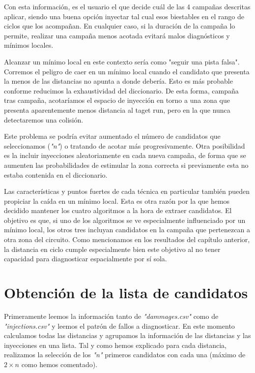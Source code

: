 Con esta información, es el usuario el que decide cuál de las 4 campañas descritas
aplicar, siendo una buena opción inyectar tal cual esos biestables en el rango de
ciclos que los acompañan. En cualquier caso, si la duración de la campaña lo
permite, realizar una campaña menos acotada evitará malos diagnósticos y mínimos
locales.

Alcanzar un mínimo local en este contexto sería como "seguir una pista falsa".
Corremos el peligro de caer en un mínimo local cuando el candidato que presenta la
menos de las distancias no apunta a donde debería. Esto es más probable conforme
reducimos la exhaustividad del diccionario. De esta forma, campaña tras campaña,
acotaríamos el espacio de inyección en torno a una zona que presenta aparentemente
menos distancia al taget run, pero en la que nunca detectaremos una colisión. 

Este problema se podría evitar aumentado el número de candidatos que seleccionamos
(\textit{"n"}) o tratando de acotar más progresivamente. Otra posibilidad es la
incluir inyecciones aleatoriamente en cada nueva campaña, de forma que se aumenten
las probabilidades de estimular la zona correcta si previamente esta no estaba
contenida en el diccionario.

Las características y puntos fuertes de cada técnica en particular también pueden
propiciar la caída en un mínimo local. Esta es otra razón por la que hemos
decidido mantener los cuatro algoritmos a la hora de extraer candidatos. El
objetivo es que, si uno de los algoritmos se ve especialmente influenciado por un
mínimo local, los otros tres incluyan candidatos en la campaña que pertenezcan a
otra zona del circuito. Como mencionamos en los resultados del capítulo anterior,
la distancia en ciclo cumple especialmente bien este objetivo al no tener
capacidad para diagnosticar espacialmente por sí sola.

\section{Obtención de la lista de candidatos}
\label{sec:Candidatos}
Primeramente leemos la información tanto de \textit{"dammages.csv"} como de 
\textit{"injections.csv"} y leemos el patrón de fallos a diagnosticar. En este
momento calculamos todas las distancias y agrupamos la información de las
distancias y las inyecciones en una lista. Tal y como hemos explicado para cada
distancia, realizamos la selección de los \textit{"n"} primeros candidatos con
cada una (máximo de $2 \times n$ como hemos comentado).

